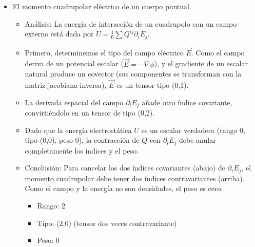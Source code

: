 \documentclass[11pt,spanish]{article}
\begin{document}
\begin{itemize}
\item El momento cuadrupolar eléctrico de un cuerpo puntual.
\begin{itemize}
\item Análisis: La energía de interacción de un cuadrupolo con un campo externo está dada por $U = \frac{1}{6} \sum Q^{ij} \partial_i E_j$. 
\item Primero, determinemos el tipo del campo eléctrico $\vec{E}$. Como el campo deriva de un potencial escalar ($\vec{E} = -\nabla \phi$), y el gradiente de un escalar natural produce un covector (sus componentes se transforman con la matriz jacobiana inversa), $\vec{E}$ es un tensor tipo (0,1).
\item La derivada espacial del campo $\partial_i E_j$ añade otro índice covariante, convirtiéndolo en un tensor de tipo (0,2).
\item Dado que la energía electrostática $U$ es un escalar verdadero (rango 0, tipo (0,0), peso 0), la contracción de $Q$ con $\partial_i E_j$ debe anular completamente los índices y el peso.
\item Conclusión: Para cancelar los dos índices covariantes (abajo) de $\partial_i E_j$, el momento cuadrupolar debe tener dos índices contravariantes (arriba). Como el campo y la energía no son densidades, el peso es cero.
\begin{itemize}
\item Rango: 2
\item Tipo: (2,0) (tensor dos veces contravariante)
\item Peso: 0
\end{itemize}
\end{itemize}


\end{itemize}
\end{document}
